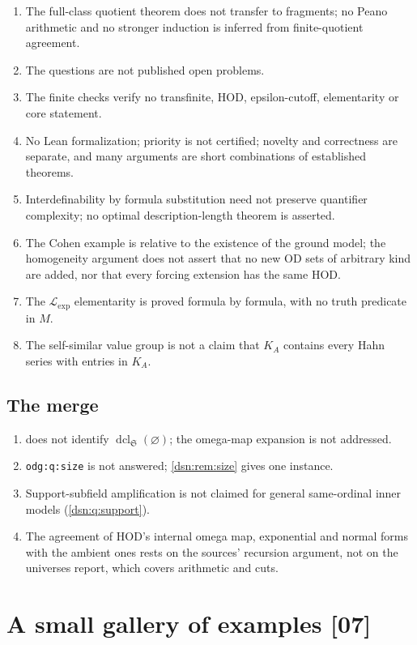 \documentclass[11pt,a4paper]{article}
\numberwithin{equation}{section}
\theoremstyle{definition}
\theoremstyle{remark}
\newcommand{\OD}{\mathrm{OD}}
\newcommand{\HOD}{\mathrm{HOD}}
\newcommand{\dcl}{\operatorname{dcl}}
\newcommand{\Lexp}{\mathcal L_{\exp}}
\newcommand{\src}[1]{\textup{\textsf{\small[#1]}}}
\newcommand{\lbl}[1]{\nolinkurl{#1}}
\begin{document}
\begin{enumerate}[label=N7.\arabic*]
transferred to the pure algebraically closed-field language.
\item The full-class quotient theorem does not transfer to fragments; no
Peano arithmetic and no stronger induction is inferred from finite-quotient
agreement.
\item The questions are not published open problems.
\item The finite checks verify no transfinite, $\HOD$, epsilon-cutoff,
elementarity or core statement.
\item No Lean formalization; priority is not certified; novelty and
correctness are separate, and many arguments are short combinations of
established theorems.
\item Interdefinability by formula substitution need not preserve
quantifier complexity; no optimal description-length theorem is asserted.
\item The Cohen example is relative to the existence of the ground model; the
homogeneity argument does not assert that no new $\OD$ sets of arbitrary
kind are added, nor that every forcing extension has the same $\HOD$.
\item The $\Lexp$ elementarity is proved formula by formula, with no truth
predicate in $M$.
\item The self-similar value group is not a claim that $K_A$ contains every
Hahn series with entries in $K_A$.
\end{enumerate}

\subsection{The merge}
\begin{enumerate}[label=NM.\arabic*]
\item {} does not identify $\dcl_{\mathfrak S}(\varnothing)$;
the omega-map expansion is not addressed.
\item \lbl{odg:q:size} is not answered; \cref{dsn:rem:size} gives one instance.
\item Support-subfield amplification is not claimed for general same-ordinal
inner models (\cref{dsn:q:support}).
\item The agreement of $\HOD$'s internal omega map, exponential and normal
forms with the ambient ones rests on the sources' recursion argument, not on
the universes report, which covers arithmetic and cuts.
\end{enumerate}

\section{A small gallery of examples \src{07}}
\end{document}
